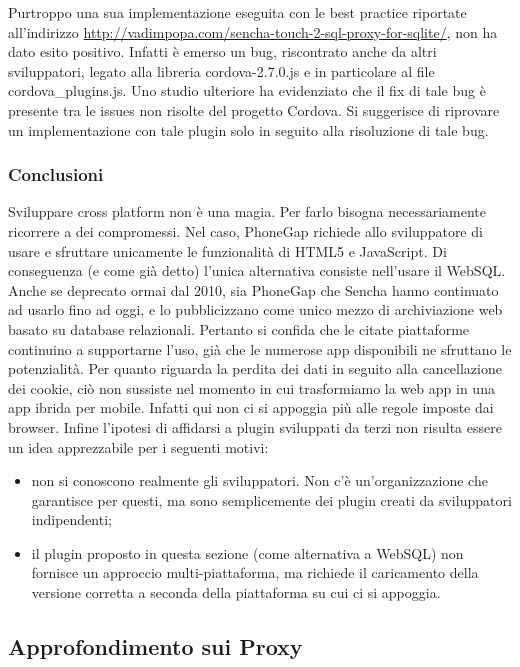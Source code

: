 \documentclass[10pt,a4paper,onecolumn]{article}
\begin{document}
Purtroppo una sua implementazione eseguita con le best practice riportate all'indirizzo \url{http://vadimpopa.com/sencha-touch-2-sql-proxy-for-sqlite/}, non ha dato esito positivo. Infatti è emerso un bug, riscontrato anche da altri sviluppatori, legato alla libreria cordova-2.7.0.js e in particolare al file cordova\_plugins.js. Uno studio ulteriore ha evidenziato che il fix di tale bug è presente tra le issues non risolte del progetto Cordova. Si suggerisce di riprovare un implementazione con tale plugin solo in seguito alla risoluzione di tale bug.

\subsubsection{Conclusioni}

Sviluppare cross platform non è una magia. Per farlo bisogna necessariamente ricorrere a dei compromessi. Nel caso, PhoneGap richiede allo sviluppatore di usare e sfruttare unicamente le funzionalità di HTML5 e JavaScript. Di conseguenza (e come già detto) l'unica alternativa consiste nell'usare il WebSQL. Anche se deprecato ormai dal 2010, sia PhoneGap che Sencha hanno continuato ad usarlo fino ad oggi, e lo pubblicizzano come unico mezzo di archiviazione web basato su database relazionali. Pertanto si confida che le citate piattaforme continuino a supportarne l'uso, già che le numerose app disponibili ne sfruttano le potenzialità. Per quanto riguarda la perdita dei dati in seguito alla cancellazione dei cookie, ciò non sussiste nel momento in cui trasformiamo la web app in una app ibrida per mobile. Infatti qui non ci si appoggia più alle regole imposte dai browser. Infine l'ipotesi di affidarsi a plugin sviluppati da terzi non risulta essere un idea apprezzabile per i seguenti motivi:

\begin{itemize}
	\item non si conoscono realmente gli sviluppatori. Non c'è un'organizzazione che garantisce per questi, ma sono semplicemente dei plugin creati da sviluppatori indipendenti;
	\item il plugin proposto in questa sezione (come alternativa a WebSQL) non fornisce un approccio multi-piattaforma, ma richiede il caricamento della versione corretta a seconda della piattaforma su cui ci si appoggia.
\end{itemize}

\subsection{Approfondimento sui Proxy}
\end{document}
